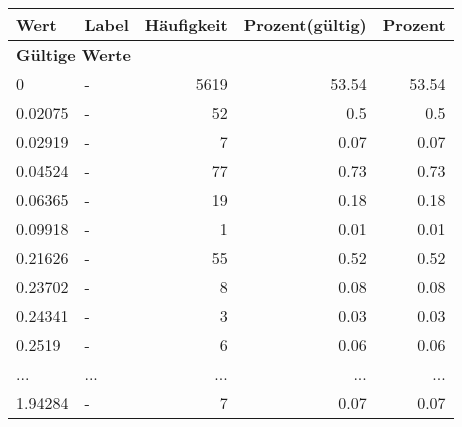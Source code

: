      \begin{longtable}{lXrrr}
     \toprule
     \textbf{Wert} & \textbf{Label} & \textbf{Häufigkeit} & \textbf{Prozent(gültig)} & \textbf{Prozent} \\
     \endhead
     \midrule
     \multicolumn{5}{l}{\textbf{Gültige Werte}}\\
        0 & \multicolumn{1}{X}{-} & %
          \num{5619} &
          \num[round-mode=places,round-precision=2]{53.54} &
          \num[round-mode=places,round-precision=2]{53.54} \\
        0.02075 & \multicolumn{1}{X}{-} & %
          \num{52} &
          \num[round-mode=places,round-precision=2]{0.5} &
          \num[round-mode=places,round-precision=2]{0.5} \\
        0.02919 & \multicolumn{1}{X}{-} & %
          \num{7} &
          \num[round-mode=places,round-precision=2]{0.07} &
          \num[round-mode=places,round-precision=2]{0.07} \\
        0.04524 & \multicolumn{1}{X}{-} & %
          \num{77} &
          \num[round-mode=places,round-precision=2]{0.73} &
          \num[round-mode=places,round-precision=2]{0.73} \\
        0.06365 & \multicolumn{1}{X}{-} & %
          \num{19} &
          \num[round-mode=places,round-precision=2]{0.18} &
          \num[round-mode=places,round-precision=2]{0.18} \\
        0.09918 & \multicolumn{1}{X}{-} & %
          \num{1} &
          \num[round-mode=places,round-precision=2]{0.01} &
          \num[round-mode=places,round-precision=2]{0.01} \\
        0.21626 & \multicolumn{1}{X}{-} & %
          \num{55} &
          \num[round-mode=places,round-precision=2]{0.52} &
          \num[round-mode=places,round-precision=2]{0.52} \\
        0.23702 & \multicolumn{1}{X}{-} & %
          \num{8} &
          \num[round-mode=places,round-precision=2]{0.08} &
          \num[round-mode=places,round-precision=2]{0.08} \\
        0.24341 & \multicolumn{1}{X}{-} & %
          \num{3} &
          \num[round-mode=places,round-precision=2]{0.03} &
          \num[round-mode=places,round-precision=2]{0.03} \\
        0.2519 & \multicolumn{1}{X}{-} & %
          \num{6} &
          \num[round-mode=places,round-precision=2]{0.06} &
          \num[round-mode=places,round-precision=2]{0.06} \\
       ... & ... & ... & ... & ... \\
        1.94284 & \multicolumn{1}{X}{-} & %
          \num{7} &
          \num[round-mode=places,round-precision=2]{0.07} &
          \num[round-mode=places,round-precision=2]{0.07} \\


\end{longtable}

